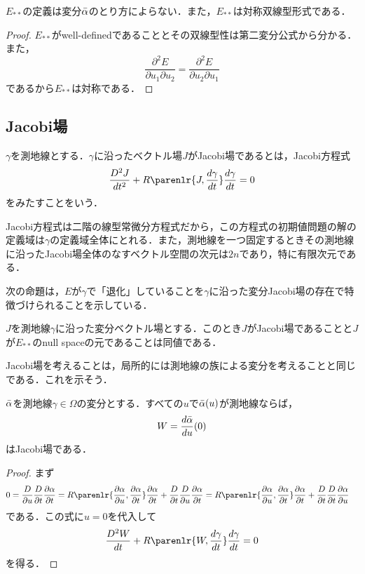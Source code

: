 \documentclass[uplatex]{jsarticle}
\begin{document}
\begin{proposition}
$E_{\ast \ast}$の定義は変分$\Bar{\alpha}$のとり方によらない．また，$E_{\ast \ast}$は対称双線型形式である．
\end{proposition}
\begin{proof}
$E_{\ast \ast}$がwell-definedであることとその双線型性は第二変分公式から分かる．また，
\[ \frac{\partial^2 E}{\partial u_1 \partial u_2} = \frac{\partial^2 E}{\partial u_2 \partial u_1} \]
であるから$E_{\ast \ast}$は対称である．
\end{proof}

\subsection{Jacobi場}

\begin{definition}
$\gamma$を測地線とする．$\gamma$に沿ったベクトル場$J$がJacobi場であるとは，Jacobi方程式
\[ \frac{D^2J}{dt^2}+R\parenlr{J,\frac{d\gamma}{dt}}\frac{d\gamma}{dt} = 0 \]
をみたすことをいう．
\end{definition}

\begin{remark}
Jacobi方程式は二階の線型常微分方程式だから，この方程式の初期値問題の解の定義域は$\gamma$の定義域全体にとれる．また，測地線を一つ固定するときその測地線に沿ったJacobi場全体のなすベクトル空間の次元は$2n$であり，特に有限次元である．
\end{remark}

次の命題は，$E$が$\gamma$で「退化」していることを$\gamma$に沿った変分Jacobi場の存在で特徴づけられることを示している．

\begin{proposition}
$J$を測地線$\gamma$に沿った変分ベクトル場とする．このとき$J$がJacobi場であることと$J$が$E_{\ast \ast}$のnull spaceの元であることは同値である．
\end{proposition}

Jacobi場を考えることは，局所的には測地線の族による変分を考えることと同じである．これを示そう．

\begin{proposition}
$\Bar{\alpha}$を測地線$\gamma \in \Omega$の変分とする．すべての$u$で$\Bar{\alpha}(u)$が測地線ならば，
\[ W = \frac{d\Bar{\alpha}}{du}(0) \]
はJacobi場である．
\end{proposition}
\begin{proof}
まず
\begin{align*}
    0 &= \frac{D}{\partial u} \frac{D}{\partial t} \frac{\partial \alpha}{\partial t} 
      = R\parenlr{\frac{\partial \alpha}{\partial u},\frac{\partial \alpha}{\partial t}}\frac{\partial \alpha}{\partial t}+\frac{D}{\partial t}\frac{D}{\partial u}\frac{\partial \alpha}{\partial t}  
      = R\parenlr{\frac{\partial \alpha}{\partial u},\frac{\partial \alpha}{\partial t}}\frac{\partial \alpha}{\partial t}+\frac{D}{\partial t}\frac{D}{\partial t}\frac{\partial \alpha}{\partial u}
\end{align*}
である．この式に$u=0$を代入して
\[ \frac{D^2W}{dt}+R\parenlr{W,\frac{d\gamma}{dt}}\frac{d\gamma}{dt} =0 \]
を得る．
\end{proof}
\end{document}
